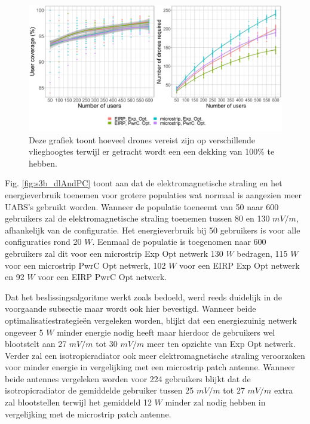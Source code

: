 \documentclass[twocolumn]{phdsymp_dutch}
\begin{document}
\begin{figure}[h]
  \includegraphics[width=\linewidth]{../results/s3/uvsnumdronesAndCov.png}
  \caption{Deze grafiek toont hoeveel drones vereist zijn op verschillende vlieghoogtes terwijl er getracht wordt een een dekking van 100\% te hebben.}
  \label{fig:s3b_numdronesAndCov}
\end{figure}

Fig. \ref{fig:s3b_dlAndPC} toont aan dat de elektromagnetische straling en het energieverbruik toenemen voor grotere populaties wat normaal is aangezien meer \gls{UABS}'s
gebruikt worden. Wanneer de populatie toeneemt van 50 naar 600 gebruikers zal 
de elektromagnetische straling toenemen tussen 80 en 130 $mV/m$, afhankelijk van de configuratie. 
Het energieverbruik bij 50 gebruikers is voor alle configuraties rond 20 $W$.
Eenmaal de populatie is toegenomen naar 600 gebruikers zal dit voor een
microstrip \gls{Exp Opt} netwerk 130 $W$ bedragen, 115 $W$ voor een microstrip \gls{PwrC Opt} netwerk,
102 $W$ voor een \gls{EIRP} \gls{Exp Opt} netwerk en 92 $W$ voor een  \gls{EIRP} \gls{PwrC Opt} netwerk.

Dat het beslissingsalgoritme werkt zoals bedoeld, werd reeds duidelijk in de voorgaande subsectie maar wordt
ook hier bevestigd. Wanneer beide optimalisatiestrategieën vergeleken worden,
blijkt dat een energiezuinig netwerk ongeveer 5 $W$ minder energie nodig heeft maar hierdoor de gebruikers wel 
blootstelt aan 27 $mV/m$ tot 30 $mV/m$ meer ten opzichte van \gls{Exp Opt} netwerk.
Verder zal een \gls{isotropicradiator} ook meer elektromagnetische straling veroorzaken 
voor minder energie in vergelijking met een microstrip patch antenne.
Wanneer beide antennes vergeleken worden voor 224 gebruikers blijkt 
dat de \gls{isotropicradiator} de gemiddelde gebruiker tussen 
 25 $mV/m$ tot 27 $mV/m$ extra zal blootstellen
 terwijl het gemiddeld 12 $W$ minder zal nodig hebben in vergelijking met de microstrip patch antenne.
\end{document}
